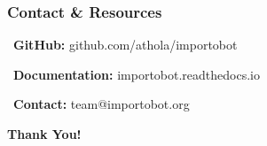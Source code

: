 
\begin{frame}
\frametitle{Contact \& Resources}
\begin{center}
\Large
\vspace{1cm}
\faGithub\ \textbf{GitHub:} github.com/athola/importobot

\vspace{0.5cm}
\faBook\ \textbf{Documentation:} importobot.readthedocs.io

\vspace{0.5cm}
\faEnvelope\ \textbf{Contact:} team@importobot.org

\vspace{1.5cm}
\textbf{Thank You!}
\end{center}
\end{frame}